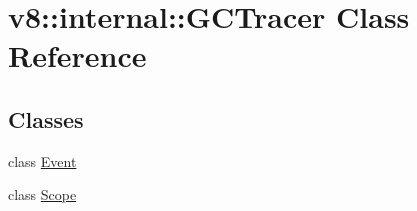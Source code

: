 \hypertarget{classv8_1_1internal_1_1_g_c_tracer}{}\section{v8\+:\+:internal\+:\+:G\+C\+Tracer Class Reference}
\label{classv8_1_1internal_1_1_g_c_tracer}
\subsection*{Classes}
\begin{DoxyCompactItemize}
\item 
class \hyperlink{classv8_1_1internal_1_1_g_c_tracer_1_1_event}{Event}
\item 
class \hyperlink{classv8_1_1internal_1_1_g_c_tracer_1_1_scope}{Scope}
\end{DoxyCompactItemize}
